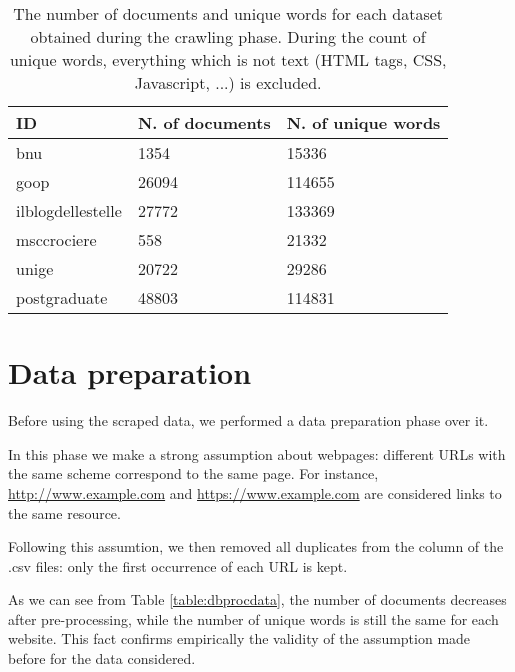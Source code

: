 \begin{table}[H]
    \begin{center}
        \begin{tabular}{ |l|l|l| }
            \hline
            ID                & N. of documents & N. of unique words \\
            \hline
            bnu               & 1354            & 15336              \\
            \hline
            goop              & 26094           & 114655             \\
            \hline
            ilblogdellestelle & 27772           & 133369             \\
            \hline
            msccrociere       & 558             & 21332              \\
            \hline
            unige             & 20722           & 29286              \\
            \hline
            postgraduate      & 48803           & 114831             \\
            \hline
        \end{tabular}
    \end{center}
    \caption{
        The number of documents and unique words for each dataset obtained during the crawling phase.
        During the count of unique words, everything which is not text (HTML tags, CSS, Javascript, ...) is excluded.
    }
    \label{table:dbdata}
\end{table}

\section{Data preparation} \label{preprocessing}
Before using the scraped data, we performed a data preparation phase over it.

In this phase we make a strong assumption about webpages:
different URLs with the same scheme correspond to the same page.
For instance, \url{http://www.example.com} and \url{https://www.example.com}
are considered links to the same resource.

Following this assumtion, we then removed all duplicates from the  column
of the .csv files: only the first occurrence of each URL is kept.

As we can see from Table \ref{table:dbprocdata}, the number of documents decreases after pre-processing,
while the number of unique words is still the same for each website.
This fact confirms empirically the validity of the assumption made before for the data considered.

